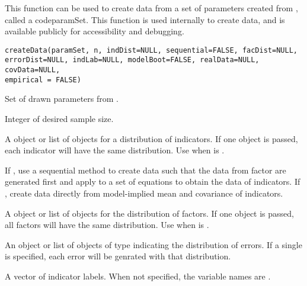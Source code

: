 \documentclass[a4paper]{book}
\begin{document}
%
\begin{Description}\relax
This function can be used to create data from a set of parameters created from , called a codeparamSet. This function is used internally to create data, and is available publicly for accessibility and debugging.
\end{Description}
%
\begin{Usage}
\begin{verbatim}
createData(paramSet, n, indDist=NULL, sequential=FALSE, facDist=NULL, 
errorDist=NULL, indLab=NULL, modelBoot=FALSE, realData=NULL, covData=NULL, 
empirical = FALSE)
\end{verbatim}
\end{Usage}
%
\begin{Arguments}
\begin{ldescription}
\item[\code{paramSet}] 
Set of drawn parameters from .

\item[\code{n}] 
Integer of desired sample size.

\item[\code{indDist}] 
A  object or list of objects for a distribution of indicators. If one object is passed, each indicator will have the same distribution. Use when  is .

\item[\code{sequential}] 
If , use a sequential method to create data such that the data from factor are generated first and apply to a set of equations to obtain the data of indicators. If , create data directly from model-implied mean and covariance of indicators.

\item[\code{facDist}] 
A  object or list of objects for the distribution of factors. If one object is passed, all factors will have the same distribution. Use when  is .

\item[\code{errorDist}] 
An object or list of objects of type  indicating the distribution of errors. If a single  is specified, each error will be genrated with that distribution.

\item[\code{indLab}] 
A vector of indicator labels. When not specified, the variable names are .


\end{ldescription}
\end{Arguments}
\end{document}
